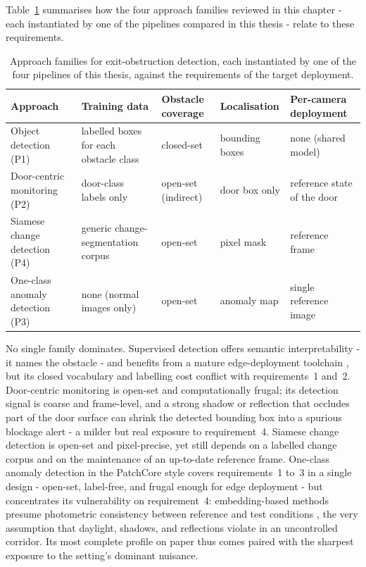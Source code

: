 Table~\ref{tab:sota-comparison} summarises how the four approach families
reviewed in this chapter - each instantiated by one of the pipelines compared
in this thesis - relate to these requirements.

\begin{table}[ht]
  \centering
  \small
  \begin{tabular}{|p{3cm}|p{2.4cm}|p{2.2cm}|p{2.4cm}|p{2.6cm}|}
    \hline
    \textbf{Approach} & \textbf{Training data} & \textbf{Obstacle coverage} & \textbf{Localisation} & \textbf{Per-camera deployment} \\
    \hline
    Object detection (P1) \cite{Gallo2022,Miglionico2025,Shin2025} &
    labelled boxes for each obstacle class &
    closed-set &
    bounding boxes &
    none (shared model) \\
    \hline
    Door-centric monitoring (P2) \cite{Talebi2026} &
    door-class labels only &
    open-set (indirect) &
    door box only &
    reference state of the door \\
    \hline
    Siamese change detection (P4) \cite{Santana2020} &
    generic change-segmentation corpus &
    open-set &
    pixel mask &
    reference frame \\
    \hline
    One-class anomaly detection (P3) \cite{Roth2022} &
    none (normal images only) &
    open-set &
    anomaly map &
    single reference image \\
    \hline
  \end{tabular}
  \caption{Approach families for exit-obstruction detection, each instantiated
  by one of the four pipelines of this thesis, against the requirements of the
  target deployment.}
  \label{tab:sota-comparison}
\end{table}

No single family dominates. Supervised detection offers semantic
interpretability - it names the obstacle - and benefits from a mature
edge-deployment toolchain \cite{Mittal2024,Miglionico2025}, but its closed
vocabulary and labelling cost conflict with requirements~1 and~2. Door-centric
monitoring \cite{Talebi2026} is open-set and computationally frugal; its detection signal is coarse and frame-level, and a strong shadow or reflection that occludes part of the door surface can shrink the detected bounding box into a spurious blockage alert - a milder but real exposure to requirement~4. Siamese change detection
\cite{Santana2020} is open-set and pixel-precise, yet still depends on a
labelled change corpus and on the maintenance of an up-to-date reference frame.
One-class anomaly detection in the PatchCore style \cite{Roth2022} covers
requirements~1 to~3 in a single design - open-set, label-free, and frugal
enough for edge deployment - but concentrates its vulnerability on
requirement~4: embedding-based methods presume photometric consistency between
reference and test conditions \cite{Cao2025}, the very assumption that
daylight, shadows, and reflections violate in an uncontrolled corridor. Its most complete profile on paper thus comes paired with the
sharpest exposure to the setting's dominant nuisance.

